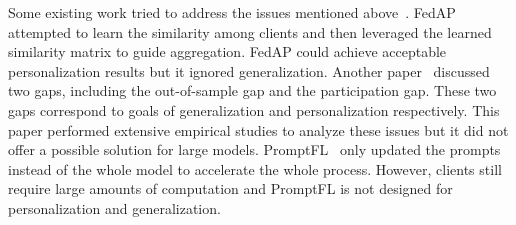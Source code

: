 \documentclass[11pt]{article}
\newcommand{\wjdd}[1]{\todo[linecolor=cyan,backgroundcolor=cyan!25,bordercolor=cyan,size=\scriptsize]{(WJD): #1}}
\begin{document}


Some existing work tried to address the issues mentioned above~\cite{lu2022personalized, Honglinyuan2022, guo2022promptfl}.
FedAP~\cite{lu2022personalized} attempted to learn the similarity among clients and then leveraged the learned similarity matrix to guide aggregation.
FedAP could achieve acceptable personalization results but it ignored generalization.
Another paper~\cite{Honglinyuan2022} discussed two gaps, including the out-of-sample gap and the participation gap.
These two gaps correspond to goals of generalization and personalization respectively.
This paper performed extensive empirical studies to analyze these issues but it did not offer a possible solution for large models.
PromptFL~\cite{guo2022promptfl} only updated the prompts instead of the whole model to accelerate the whole process.
However, clients still require large amounts of computation and PromptFL is not designed for personalization and generalization.
\end{document}
